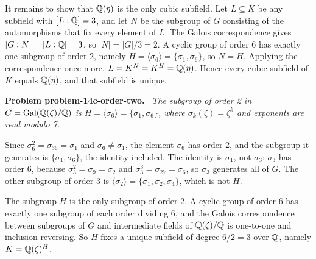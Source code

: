 \documentclass[11pt]{article}
\newenvironment{problem}[1]
  {\par\medskip\noindent\textbf{Problem #1.}\ \itshape}
  {\par\medskip}
\begin{document}
It remains to show that $\mathbb{Q}(\eta)$ is the only cubic subfield. Let $L\subseteq K$ be any subfield with $[L:\mathbb{Q}]=3$, and let $N$ be the subgroup of $G$ consisting of the automorphisms that fix every element of $L$. The Galois correspondence gives $[G:N]=[L:\mathbb{Q}]=3$, so $|N|=|G|/3=2$. A cyclic group of order $6$ has exactly one subgroup of order $2$, namely $H=\langle\sigma_6\rangle=\{\sigma_1,\sigma_6\}$, so $N=H$. Applying the correspondence once more, $L=K^N=K^H=\mathbb{Q}(\eta)$. Hence every cubic subfield of $K$ equals $\mathbb{Q}(\eta)$, and that subfield is unique.

\begin{problem}{problem-14c-order-two}
The subgroup of order 2 in $G=\operatorname{Gal}(\mathbb{Q}(\zeta)/\mathbb{Q})$ is $H=\langle\sigma_6\rangle=\{\sigma_1,\sigma_6\}$, where $\sigma_k(\zeta)=\zeta^k$ and exponents are read modulo 7.
\end{problem}
Since $\sigma_6^2=\sigma_{36}=\sigma_1$ and $\sigma_6\ne\sigma_1$, the element $\sigma_6$ has order 2, and the subgroup it generates is $\{\sigma_1,\sigma_6\}$, the identity included. The identity is $\sigma_1$, not $\sigma_3$: $\sigma_3$ has order 6, because $\sigma_3^2=\sigma_9=\sigma_2$ and $\sigma_3^3=\sigma_{27}=\sigma_6$, so $\sigma_3$ generates all of $G$. The other subgroup of order 3 is $\langle\sigma_2\rangle=\{\sigma_1,\sigma_2,\sigma_4\}$, which is not $H$.

The subgroup $H$ is the only subgroup of order 2. A cyclic group of order 6 has exactly one subgroup of each order dividing 6, and the Galois correspondence between subgroups of $G$ and intermediate fields of $\mathbb{Q}(\zeta)/\mathbb{Q}$ is one-to-one and inclusion-reversing. So $H$ fixes a unique subfield of degree $6/2=3$ over $\mathbb{Q}$, namely $K=\mathbb{Q}(\zeta)^H$.
\end{document}
